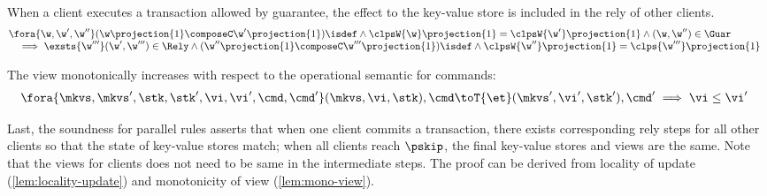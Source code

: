 \begin{lemma}
\label{lem:locality-update}
When a client executes a transaction allowed by guarantee, the effect to the key-value store is included in the rely of other clients.
\[
\begin{array}{@{}l}
    \fora{\w, \w', \w''} (\w\projection{1} \composeC \w'\projection{1})\isdef \land \clpsW{\w}\projection{1} = \clpsW{\w'}\projection{1} \land (\w, \w'') \in \Guar  \\
    \quad \implies \exsts{\w'''} (\w', \w''') \in \Rely \land (\w''\projection{1} \composeC \w'''\projection{1})\isdef \land \clpsW{\w''}\projection{1} = \clps{\w'''}\projection{1}
\end{array} 
\]
\end{lemma}

\begin{lemma}
\label{lem:mono-view}
The view monotonically increases with respect to the operational semantic for commands:
\[
    \begin{array}{@{}l}
        \fora{\mkvs, \mkvs', \stk, \stk', \vi, \vi', \cmd, \cmd'} (\mkvs, \vi, \stk), \cmd \toT{\et} (\mkvs', \vi', \stk'), \cmd' \implies \vi \leq \vi'
    \end{array}
\]
\end{lemma}

Last, the soundness for parallel rules asserts that when one client commits a transaction, there exists corresponding rely steps for all other clients so that the state of key-value stores match; when all clients reach \( \pskip \), the final key-value stores and views are the same.
Note that the views for clients does not need to be same in the intermediate steps.
The proof can be derived from locality of update (\cref{lem:locality-update}) and monotonicity of view (\cref{lem:mono-view}).

